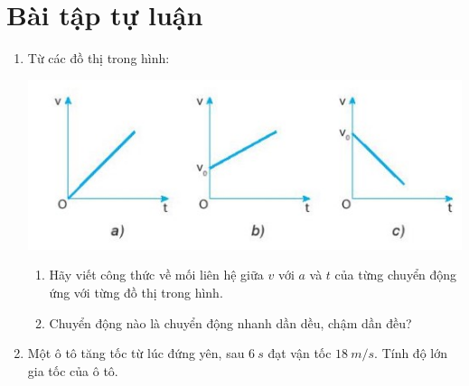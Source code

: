 \section{Bài tập tự luận}
\begin{enumerate}[label=\bfseries Bài \arabic*:]
	\item {}
	
	{ Từ các đồ thị trong hình:
		\begin{center}
			\includegraphics[scale=1]{../figs/VN10-2022-PH-TP012-1.jpg}
		\end{center}
		
		\begin{enumerate}[label=\alph*)]
			\item Hãy viết công thức về mối liên hệ giữa $v$ với $a$ và $t$ của từng chuyển động ứng với từng đồ thị trong hình.
			\item Chuyển động nào là chuyển động nhanh dần dều, chậm dần đều?
		\end{enumerate}
		
	}
	

		\item {}
	
	{
		Một ô tô tăng tốc từ lúc đứng yên, sau $\SI{6}{s}$ đạt vận tốc $\SI{18}{m/s}$. Tính độ lớn gia tốc của ô tô.
	}
	\hideall{
		
}
\end{enumerate}
